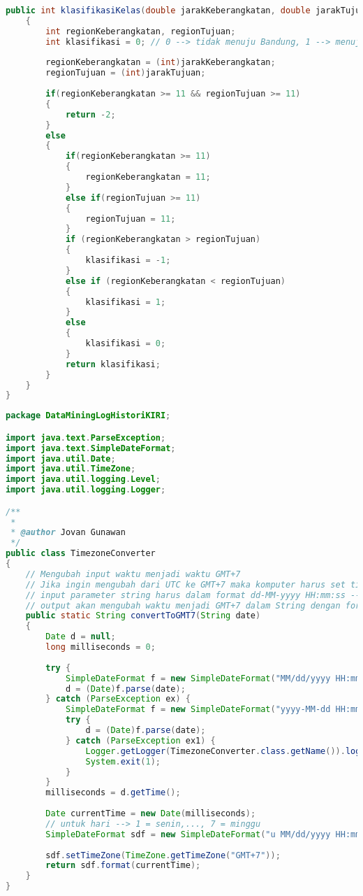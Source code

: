 \begin{lstlisting}[language=Java,basicstyle=\tiny,caption=ProcessingData.java]
    public int klasifikasiKelas(double jarakKeberangkatan, double jarakTujuan)
    {
        int regionKeberangkatan, regionTujuan;
        int klasifikasi = 0; // 0 --> tidak menuju Bandung, 1 --> menuju Bandung, 2 --> menuju region yang sama
        
        regionKeberangkatan = (int)jarakKeberangkatan;
        regionTujuan = (int)jarakTujuan;
        
        if(regionKeberangkatan >= 11 && regionTujuan >= 11)
        {
            return -2;
        }
        else
        {
            if(regionKeberangkatan >= 11)
            {
                regionKeberangkatan = 11;
            }
            else if(regionTujuan >= 11)
            {
                regionTujuan = 11;
            }
            if (regionKeberangkatan > regionTujuan)
            {
                klasifikasi = -1;
            }
            else if (regionKeberangkatan < regionTujuan)
            {
                klasifikasi = 1;
            }
            else
            {
                klasifikasi = 0;
            }
            return klasifikasi;
        }
    }
}

\end{lstlisting}

\begin{lstlisting}[language=Java,basicstyle=\tiny,caption=TimezoneConverter.java]
package DataMiningLogHistoriKIRI;

import java.text.ParseException;
import java.text.SimpleDateFormat;
import java.util.Date;
import java.util.TimeZone;
import java.util.logging.Level;
import java.util.logging.Logger;

/**
 *
 * @author Jovan Gunawan
 */
public class TimezoneConverter 
{
    // Mengubah input waktu menjadi waktu GMT+7
    // Jika ingin mengubah dari UTC ke GMT+7 maka komputer harus set timezone ke UTC
    // input parameter string harus dalam format dd-MM-yyyy HH:mm:ss --> contoh 1/1/2014  3:51:15 AM
    // output akan mengubah waktu menjadi GMT+7 dalam String dengan format EEE MM/dd/yyyy HH:mm:ss --> contoh Wed 01/01/2014 03:51:15
    public static String convertToGMT7(String date)
    {
        Date d = null;
        long milliseconds = 0;
        
        try {
            SimpleDateFormat f = new SimpleDateFormat("MM/dd/yyyy HH:mm");
            d = (Date)f.parse(date);
        } catch (ParseException ex) {
            SimpleDateFormat f = new SimpleDateFormat("yyyy-MM-dd HH:mm:ss");
            try {
                d = (Date)f.parse(date);
            } catch (ParseException ex1) {
                Logger.getLogger(TimezoneConverter.class.getName()).log(Level.SEVERE, null, ex);
                System.exit(1);
            }
        }
        milliseconds = d.getTime();
        
        Date currentTime = new Date(milliseconds);
        // untuk hari --> 1 = senin,..., 7 = minggu
        SimpleDateFormat sdf = new SimpleDateFormat("u MM/dd/yyyy HH:mm:ss");
        
        sdf.setTimeZone(TimeZone.getTimeZone("GMT+7"));
        return sdf.format(currentTime);
    }
}
\end{lstlisting}

